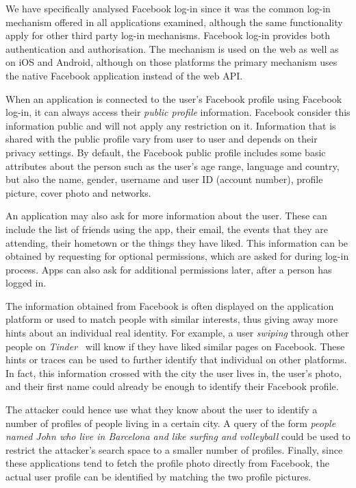 We have specifically analysed Facebook log-in since it was the common log-in mechanism offered in all applications examined, although the same functionality apply for other third party log-in mechanisms. Facebook log-in provides both authentication and authorisation. The mechanism is used on the web as well as on iOS and Android, although on those platforms the primary mechanism uses the native Facebook application instead of the web API.

When an application is connected to the user's Facebook profile using Facebook log-in, it can always access their \emph{public profile} information. Facebook consider this information public and will not apply any restriction on it. Information that is shared with the public profile vary from user to user and depends on their privacy settings. By default, the Facebook public profile includes some basic attributes about the person such as the user's age range, language and country, but also the name, gender, username and user ID (account number), profile picture, cover photo and networks.

An application may also ask for more information about the user. These can include the list of friends using the app, their email, the events that they are attending, their hometown or the things they have liked. This information can be obtained by requesting for optional permissions, which are asked for during log-in process. Apps can also ask for additional permissions later, after a person has logged in.

The information obtained from Facebook is often displayed on the application platform or used to match people with similar interests, thus giving away more hints about an individual real identity. For example, a user \emph{swiping} through other people on \emph{Tinder}~\cite{tinder} will know if they have liked similar pages on Facebook.
These hints or traces can be used to further identify that individual on other platforms. In fact, this information crossed with the city the user lives in, the user's photo, and their first name could already be enough to identify their Facebook profile.

The attacker could hence use what they know about the user to identify a number of profiles of people living in a certain city. A query of the form \emph{people named John who live in Barcelona and like surfing and volleyball} could be used to restrict the attacker's search space to a smaller number of profiles. Finally, since these applications tend to fetch the profile photo directly from Facebook, the actual user profile can be identified by matching the two profile pictures.

